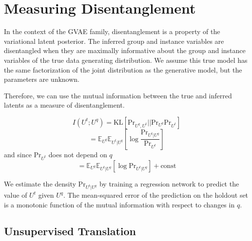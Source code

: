 \documentclass[nohyperref]{article}
\theoremstyle{plain}
\theoremstyle{definition}
\theoremstyle{remark}
\begin{document}
\section{Measuring Disentanglement}

In the context of the GVAE family, disentanglement is a property of the variational latent posterior. The inferred group and instance variables are disentangled when they are maximally informative about the group and instance variables of the true data generating distribution. We assume this true model has the same factorization of the joint distribution as the generative model, but the parameters are unknown.

Therefore, we can use the mutual information between the true and inferred latents as a measure of disentanglement.

$$I(U^t; U^q) = \mathrm{KL} [\mathrm{Pr}_{U^q, U^t} || \mathrm{Pr}_{U^q} \mathrm{Pr}_{U^t}]$$
$$= \mathbb{E}_{U^q} \mathbb{E}_{U^t | U^q} \left[ \log \frac{\mathrm{Pr}_{U^t | U^q}}{\mathrm{Pr}_{U^t}} \right]$$
and since $\mathrm{Pr}_{U^t}$ does not depend on $q$
$$= \mathbb{E}_{U^q} \mathbb{E}_{U^t | U^q} [ \log \mathrm{Pr}_{U^t | U^q}] + \mathrm{const}$$

We estimate the density $\mathrm{Pr}_{U^t | U^q}$ by training a regression network to predict the value of $U^t$ given $U^q$. The mean-squared error of the prediction on the holdout set is a monotonic function of the mutual information with respect to changes in $q$.

\subsection{Unsupervised Translation}
\end{document}

